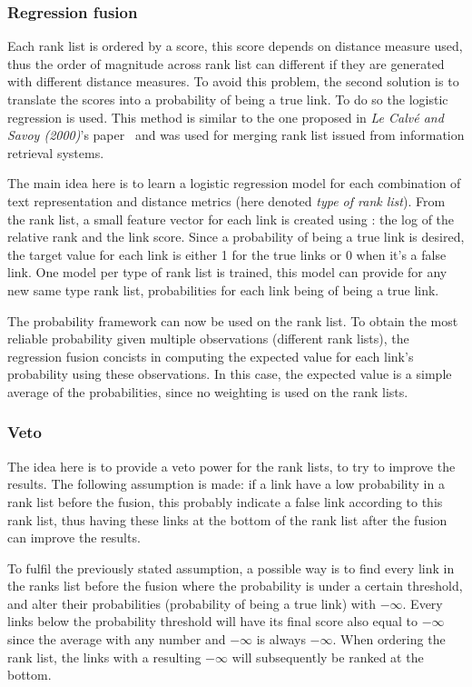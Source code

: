 \subsubsection{Regression fusion \label{sec:regression_fusion}}

Each rank list is ordered by a score, this score depends on distance measure used, thus the order of magnitude across rank list can different if they are generated with different distance measures.
To avoid this problem, the second solution is to translate the scores into a probability of being a true link.
To do so the logistic regression is used.
This method is similar to the one proposed in \textit{Le Calvé and Savoy (2000)}'s paper~\cite{le_calve_database_merging} and was used for merging rank list issued from information retrieval systems.

The main idea here is to learn a logistic regression model for each combination of text representation and distance metrics (here denoted \textit{type of rank list}).
From the rank list, a small feature vector for each link is created using : the log of the relative rank and the link score.
Since a probability of being a true link is desired, the target value for each link is either 1 for the true links or 0 when it's a false link.
One model per type of rank list is trained, this model can provide for any new same type rank list, probabilities for each link being of being a true link.

The probability framework can now be used on the rank list.
To obtain the most reliable probability given multiple observations (different rank lists), the regression fusion concists in computing the expected value for each link's probability using these observations.
In this case, the expected value is a simple average of the probabilities, since no weighting is used on the rank lists.

\subsubsection{Veto}

The idea here is to provide a veto power for the rank lists, to try to improve the results.
The following assumption is made: if a link have a low probability in a rank list before the fusion, this probably indicate a false link according to this rank list, thus having these links at the bottom of the rank list after the fusion can improve the results.

To fulfil the previously stated assumption, a possible way is to find every link in the ranks list before the fusion where the probability is under a certain threshold, and alter their probabilities (probability of being a true link) with $-\infty$.
Every links below the probability threshold will have its final score also equal to $-\infty$ since the average with any number and $-\infty$ is always $-\infty$.
When ordering the rank list, the links with a resulting $-\infty$ will subsequently be ranked at the bottom.

